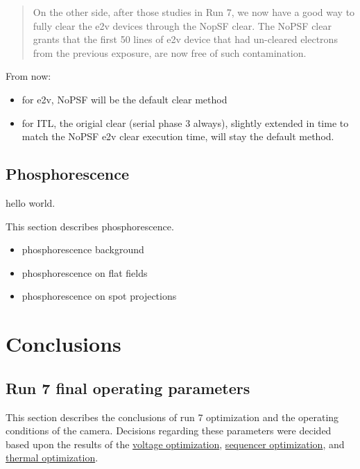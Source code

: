 \begin{quote}
On the other side, after those studies in Run 7, we now have a good way
to fully clear the e2v devices through the NopSF clear. The NoPSF clear
grants that the first 50 lines of e2v device that had un-cleared
electrons from the previous exposure, are now free of such
contamination.
\end{quote}

From now:

\begin{itemize}
\tightlist
\item
  for e2v, NoPSF will be the default clear method
\item
  for ITL, the origial clear (serial phase 3 always), slightly extended
  in time to match the NoPSF e2v clear execution time, will stay the
  default method.
\end{itemize}

\subsection{Phosphorescence}\label{phosphorescence}

hello world.

This section describes phosphorescence.

\begin{itemize}
\tightlist
\item
  phosphorescence background
\item
  phosphorescence on flat fields
\item
  phosphorescence on spot projections
\end{itemize}

\section{Conclusions}\label{conclusions}

\subsection{Run 7 final operating
parameters}\label{run-7-final-operating-parameters}

This section describes the conclusions of run 7 optimization and the
operating conditions of the camera. Decisions regarding these parameters
were decided based upon the results of the
\href{https://sitcomtn-148.lsst.io/\#persistence-optimization}{voltage
optimization},
\href{https://sitcomtn-148.lsst.io/\#sequencer-optimization}{sequencer
optimization}, and
\href{https://sitcomtn-148.lsst.io/\#thermal-optimization}{thermal
optimization}.

